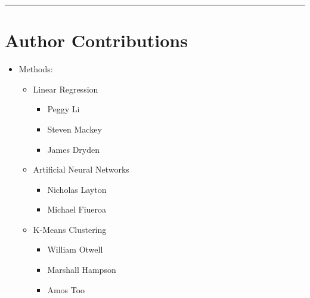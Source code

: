 \documentclass[12pt]{article}
\newcommand{\horizontalLine}{
	\begin{center}
		\hrule width 1.0\textwidth
	\end{center}
}
\begin{document}
\pagebreak
\horizontalLine
\section{Author Contributions}
\label{sec:authorContributions}
\begin{itemize}
    \item Methods:
    \begin{itemize}
        \item Linear Regression
        \begin{itemize}
            \item Peggy Li
            \item Steven Mackey
            \item James Dryden
        \end{itemize}
        \item Artificial Neural Networks
        \begin{itemize}
            \item Nicholas Layton
            \item Michael Fiueroa
        \end{itemize}
        \item K-Means Clustering
        \begin{itemize}
            \item William Otwell
            \item Marshall Hampson
            \item Amos Too
        \end{itemize}
    \end{itemize}
\end{itemize}
\end{document}
